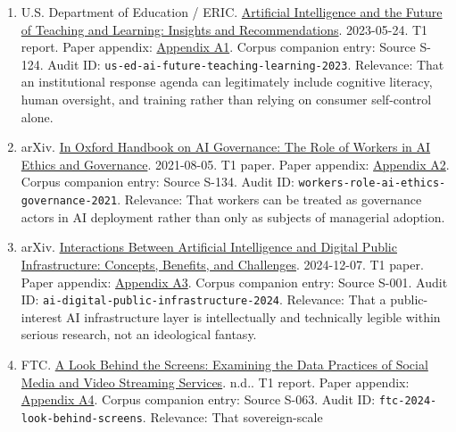 \documentclass[
  american,
  11pt,
  letterpaper,
]{article}
\providecommand{\tightlist}{%
  \setlength{\itemsep}{0pt}\setlength{\parskip}{0pt}}
\begin{document}
\begin{enumerate}
\def\labelenumi{\arabic{enumi}.}
\tightlist
\item
  U.S. Department of Education / ERIC.
  \href{https://eric.ed.gov/?id=ED631097}{Artificial Intelligence and
  the Future of Teaching and Learning: Insights and Recommendations}.
  2023-05-24. T1 report. Paper appendix:
  \hyperref[ch-10-appendix-a1-artificial-intelligence-and-the-future-of-teaching-and-learning-insights-and-recommendations]{Appendix
  A1}. Corpus companion entry: Source S-124. Audit ID:
  \texttt{us-ed-ai-future-teaching-learning-2023}. Relevance: That an
  institutional response agenda can legitimately include cognitive
  literacy, human oversight, and training rather than relying on
  consumer self-control alone.
\item
  arXiv. \href{https://arxiv.org/abs/2108.07700}{In Oxford Handbook on
  AI Governance: The Role of Workers in AI Ethics and Governance}.
  2021-08-05. T1 paper. Paper appendix:
  \hyperref[ch-10-appendix-a2-in-oxford-handbook-on-ai-governance-the-role-of-workers-in-ai-ethics-and-governance]{Appendix
  A2}. Corpus companion entry: Source S-134. Audit ID:
  \texttt{workers-role-ai-ethics-governance-2021}. Relevance: That
  workers can be treated as governance actors in AI deployment rather
  than only as subjects of managerial adoption.
\item
  arXiv. \href{https://arxiv.org/abs/2412.05761}{Interactions Between
  Artificial Intelligence and Digital Public Infrastructure: Concepts,
  Benefits, and Challenges}. 2024-12-07. T1 paper. Paper appendix:
  \hyperref[ch-10-appendix-a3-interactions-between-artificial-intelligence-and-digital-public-infrastructure-concepts-benefits-and-challenges]{Appendix
  A3}. Corpus companion entry: Source S-001. Audit ID:
  \texttt{ai-digital-public-infrastructure-2024}. Relevance: That a
  public-interest AI infrastructure layer is intellectually and
  technically legible within serious research, not an ideological
  fantasy.
\item
  FTC.
  \href{https://www.ftc.gov/reports/look-behind-screens-examining-data-practices-social-media-video-streaming-services}{A
  Look Behind the Screens: Examining the Data Practices of Social Media
  and Video Streaming Services}. n.d.. T1 report. Paper appendix:
  \hyperref[ch-10-appendix-a4-a-look-behind-the-screens-examining-the-data-practices-of-social-media-and-video-streaming-services]{Appendix
  A4}. Corpus companion entry: Source S-063. Audit ID:
  \texttt{ftc-2024-look-behind-screens}. Relevance: That sovereign-scale

\end{enumerate}
\end{document}
